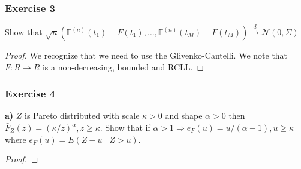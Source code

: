 \documentclass{article}
\begin{document}
\subsubsection{Exercise 3}
Show that $\sqrt{n}(\mathbb{F}^{(n)}(t_1) - F(t_1), \dots, \mathbb{F}^{(n)}(t_M) - F(t_M)) \overset{d}{\rightarrow} \mathcal{N}(0, \Sigma) $
\begin{proof}
We recognize that we need to use the Glivenko-Cantelli. We note that $F: R \rightarrow R$ is a non-decreasing, bounded and RCLL.


\end{proof}


\subsubsection{Exercise 4}
\textbf{a)}
$Z$ is Pareto distributed with scale $\kappa > 0$ and shape $\alpha > 0 $ then $\bar{F}_Z(z) = (\kappa / z )^{\alpha}, z \geq \kappa$.
Show that if $\alpha > 1 \Rightarrow e_F(u) = u / (\alpha -1), u \geq \kappa$ where $e_F(u) = E(Z-u \mid Z  > u)$. 
\begin{proof}
    
\end{proof}
\end{document}
